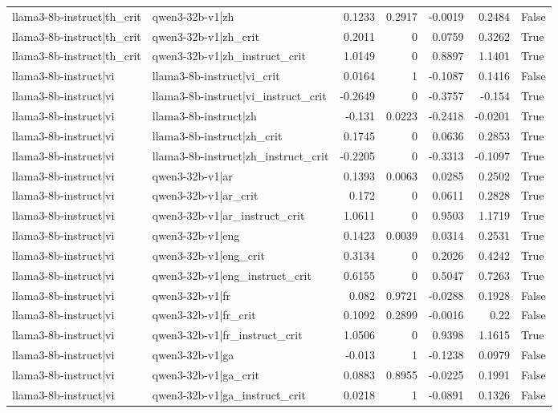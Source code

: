 \begin{table}
\begin{tabular}{l l r r r r l}
llama3-8b-instruct|th_crit & qwen3-32b-v1|zh & 0.1233 & 0.2917 & -0.0019 & 0.2484 & False \\
llama3-8b-instruct|th_crit & qwen3-32b-v1|zh_crit & 0.2011 & 0 & 0.0759 & 0.3262 & True \\
llama3-8b-instruct|th_crit & qwen3-32b-v1|zh_instruct_crit & 1.0149 & 0 & 0.8897 & 1.1401 & True \\
llama3-8b-instruct|vi & llama3-8b-instruct|vi_crit & 0.0164 & 1 & -0.1087 & 0.1416 & False \\
llama3-8b-instruct|vi & llama3-8b-instruct|vi_instruct_crit & -0.2649 & 0 & -0.3757 & -0.154 & True \\
llama3-8b-instruct|vi & llama3-8b-instruct|zh & -0.131 & 0.0223 & -0.2418 & -0.0201 & True \\
llama3-8b-instruct|vi & llama3-8b-instruct|zh_crit & 0.1745 & 0 & 0.0636 & 0.2853 & True \\
llama3-8b-instruct|vi & llama3-8b-instruct|zh_instruct_crit & -0.2205 & 0 & -0.3313 & -0.1097 & True \\
llama3-8b-instruct|vi & qwen3-32b-v1|ar & 0.1393 & 0.0063 & 0.0285 & 0.2502 & True \\
llama3-8b-instruct|vi & qwen3-32b-v1|ar_crit & 0.172 & 0 & 0.0611 & 0.2828 & True \\
llama3-8b-instruct|vi & qwen3-32b-v1|ar_instruct_crit & 1.0611 & 0 & 0.9503 & 1.1719 & True \\
llama3-8b-instruct|vi & qwen3-32b-v1|eng & 0.1423 & 0.0039 & 0.0314 & 0.2531 & True \\
llama3-8b-instruct|vi & qwen3-32b-v1|eng_crit & 0.3134 & 0 & 0.2026 & 0.4242 & True \\
llama3-8b-instruct|vi & qwen3-32b-v1|eng_instruct_crit & 0.6155 & 0 & 0.5047 & 0.7263 & True \\
llama3-8b-instruct|vi & qwen3-32b-v1|fr & 0.082 & 0.9721 & -0.0288 & 0.1928 & False \\
llama3-8b-instruct|vi & qwen3-32b-v1|fr_crit & 0.1092 & 0.2899 & -0.0016 & 0.22 & False \\
llama3-8b-instruct|vi & qwen3-32b-v1|fr_instruct_crit & 1.0506 & 0 & 0.9398 & 1.1615 & True \\
llama3-8b-instruct|vi & qwen3-32b-v1|ga & -0.013 & 1 & -0.1238 & 0.0979 & False \\
llama3-8b-instruct|vi & qwen3-32b-v1|ga_crit & 0.0883 & 0.8955 & -0.0225 & 0.1991 & False \\
llama3-8b-instruct|vi & qwen3-32b-v1|ga_instruct_crit & 0.0218 & 1 & -0.0891 & 0.1326 & False \\

\end{tabular}
\end{table}
